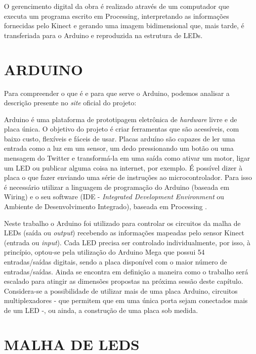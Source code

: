 O gerencimento digital da obra é realizado através de um computador que executa um programa escrito em Processing, interpretando as informações fornecidas pelo Kinect e gerando uma imagem bidimensional que, mais tarde, é transferiada para o Arduino e reproduzida na estrutura de LEDs. 


\section{ARDUINO}

Para compreender o que é e para que serve o Arduino, podemos analisar a descrição presente no \textit{site} oficial do projeto:

\begin{citacao}
Arduino é uma plataforma de prototipagem eletrônica de \textit{hardware} livre e de placa única. O objetivo do projeto é criar ferramentas que são acessíveis, com baixo custo, flexíveis e fáceis de usar. Placas arduíno são capazes de ler uma entrada como a luz em um sensor, um dedo pressionando um botão ou uma mensagem do Twitter e transformá-la em uma saída como ativar um motor, ligar um LED ou publicar alguma coisa na internet, por exemplo. É possível dizer à placa o que fazer enviando uma série de instruções ao microcontrolador. Para isso é necessário utilizar a linguagem de programação do Arduino (baseada em Wiring) e o seu software (IDE - \textit{Integrated Development Environment} ou Ambiente de Desenvolvimento Integrado), baseada em Processing \cite{arduino}. 
\end{citacao}

Neste trabalho o Arduino foi utilizado para controlar os circuitos da malha de LEDs (saída ou \textit{output}) recebendo as informações mapeadas pelo sensor Kinect (entrada ou \textit{input}). Cada LED precisa ser controlado individualmente, por isso, à princípio, optou-se pela utilização do Arduino Mega que possui 54 entradas/saídas digitais, sendo a placa disponível com o maior número de entradas/saídas. Ainda se encontra em definição a maneira como o trabalho será escalado para atingir as dimensões propostas na próxima sessão deste capítulo. Considera-se a possibilidade de utilizar mais de uma placa Arduino, circuitos multiplexadores - que permitem que em uma única porta sejam conectados mais de um LED -, ou ainda, a construção de uma placa sob medida.


\section{MALHA DE LEDS}
\label{sec:malha}

